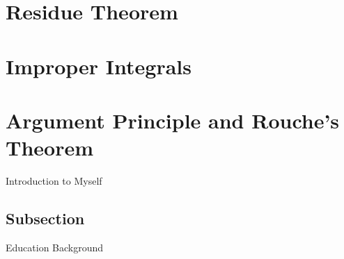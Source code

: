 \documentclass[11pt]{article}
\begin{document}

\newpage
\section{Residue Theorem}
\section{Improper Integrals}
\section{Argument Principle and Rouche's Theorem}

\iffalse
Introduction to Myself
\subsection{Subsection}
Education Background
\end{document}
